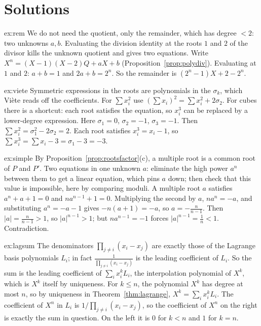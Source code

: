 \section{Solutions}

\begin{solution}{ex:rem}
\idea We do not need the quotient, only the remainder, which has degree $<2$: two unknowns $a,b$. Evaluating the division identity at the roots $1$ and $2$ of the divisor kills the unknown quotient and gives two equations.
\writeup Write $X^n=(X-1)(X-2)Q+aX+b$ (Proposition~\ref{prop:polydiv}). Evaluating at $1$ and $2$: $a+b=1$ and $2a+b=2^n$. So the remainder is $(2^n-1)X+2-2^n$.
\end{solution}

\begin{solution}{ex:viete}
\idea Symmetric expressions in the roots are polynomials in the $\sigma_k$, which Vi\`ete reads off the coefficients. For $\sum x_i^2$ use $(\sum x_i)^2=\sum x_i^2+2\sigma_2$. For cubes there is a shortcut: each root satisfies the equation, so $x_i^3$ can be replaced by a lower-degree expression.
\writeup Here $\sigma_1=0$, $\sigma_2=-1$, $\sigma_3=-1$. Then $\sum x_i^2=\sigma_1^2-2\sigma_2=2$. Each root satisfies $x_i^3=x_i-1$, so
$\sum x_i^3=\sum x_i-3=\sigma_1-3=-3$.
\end{solution}

\begin{solution}{ex:simple}
\idea By Proposition~\ref{prop:rootsfactor}(c), a multiple root is a common root of $P$ and $P'$. Two equations in one unknown $a$: eliminate the high power $a^n$ between them to get a linear equation, which pins $a$ down; then check that this value is impossible, here by comparing moduli.
\writeup A multiple root $a$ satisfies $a^n+a+1=0$ and $na^{n-1}+1=0$. Multiplying the second by $a$, $na^n=-a$, and substituting $a^n=-a-1$ gives
$-n(a+1)=-a$, so $a=-\frac n{n-1}$. Then $|a|=\frac n{n-1}>1$, so $|a|^{n-1}>1$; but $na^{n-1}=-1$ forces $|a|^{n-1}=\frac1n<1$. Contradiction.
\end{solution}

\begin{solution}{ex:lagsum}
\idea The denominators $\prod_{j\ne i}(x_i-x_j)$ are exactly those of the Lagrange basis polynomials $L_i$; in fact $\frac1{\prod_{j\ne i}(x_i-x_j)}$ is the leading coefficient of $L_i$. So the sum is the leading coefficient of $\sum_ix_i^kL_i$, the interpolation polynomial of $X^k$, which is $X^k$ itself by uniqueness.
\writeup For $k\le n$, the polynomial $X^k$ has degree at most $n$, so by uniqueness in Theorem~\ref{thm:lagrange}, $X^k=\sum_ix_i^kL_i$.
The coefficient of $X^n$ in $L_i$ is $1/\prod_{j\ne i}(x_i-x_j)$, so the coefficient of $X^n$ on the right is exactly the sum in question.
On the left it is $0$ for $k<n$ and $1$ for $k=n$.
\end{solution}

